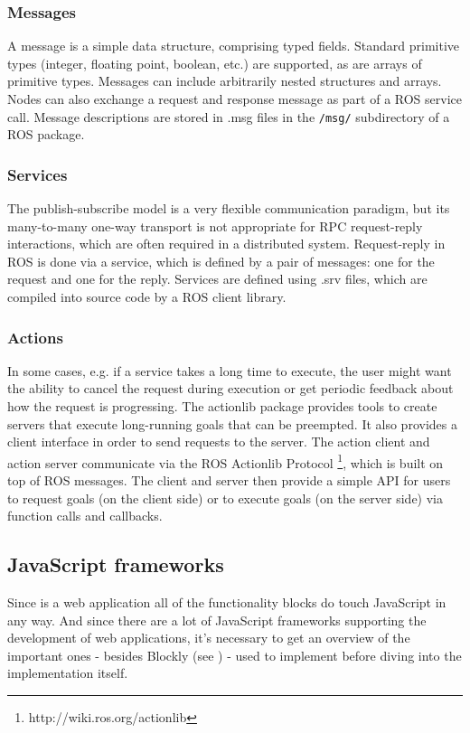 \subsubsection{Messages}
A message is a simple data structure, comprising typed fields. Standard primitive types (integer, floating point, boolean, etc.) are supported, as are arrays of primitive types. Messages can include arbitrarily nested structures and arrays. Nodes can also exchange a request and response message as part of a ROS service call. Message descriptions are stored in .msg files in the \lstinline!/msg/! subdirectory of a ROS package.

\subsubsection{Services}
The publish-subscribe model is a very flexible communication paradigm, but its many-to-many one-way transport is not appropriate for RPC request-reply interactions, which are often required in a distributed system. Request-reply in ROS is done via a service, which is defined by a pair of messages: one for the request and one for the reply. Services are defined using .srv files, which are compiled into source code by a ROS client library.

\subsubsection{Actions}
In some cases, e.g. if a service takes a long time to execute, the user might want the ability to cancel the request during execution or get periodic feedback about how the request is progressing. The actionlib package provides tools to create servers that execute long-running goals that can be preempted. It also provides a client interface in order to send requests to the server.
The action client and action server communicate via the ROS Actionlib Protocol \footnote{http://wiki.ros.org/actionlib}, which is built on top of ROS messages. The client and server then provide a simple API for users to request goals (on the client side) or to execute goals (on the server side) via function calls and callbacks.

\subsection{JavaScript frameworks} \label{sub:jsFrameworks}
Since \toolname{} is a web application all of the functionality blocks do touch JavaScript in any way. And since there are a lot of JavaScript frameworks supporting the development of web applications, it's necessary to get an overview of the important ones - besides Blockly (see ) - used to implement \toolname{} before diving into the implementation itself.

